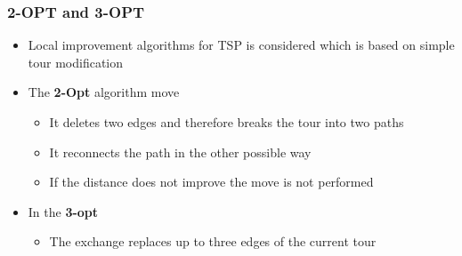 \documentclass[11pt]{article}
\begin{document}
\subsubsection{2-OPT and 3-OPT}
\label{sec:org8a4befb}
\begin{itemize}
\item Local improvement algorithms for TSP is considered which is based on simple tour modification

\item The \textbf{2-Opt} algorithm move
\begin{itemize}
\item It deletes two edges and therefore breaks the tour into two paths
\item It reconnects the path in the other possible way
\item If the distance does not improve the move is not performed
\end{itemize}

\item In the \textbf{3-opt}
\begin{itemize}
\item The exchange replaces up to three edges of the current tour
\end{itemize}
\end{itemize}
\end{document}
